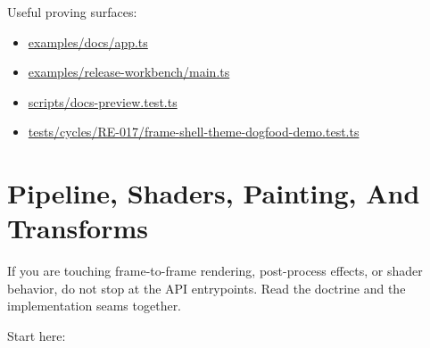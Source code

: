 Useful proving surfaces:

\begin{itemize}
\tightlist
\item
  \href{https://github.com/flyingrobots/bijou/blob/cbd70612140e7a450d764b3c7be1c6af878b99bc/examples/docs/app.ts}{examples/docs/app.ts}
\item
  \href{https://github.com/flyingrobots/bijou/blob/cbd70612140e7a450d764b3c7be1c6af878b99bc/examples/release-workbench/main.ts}{examples/release-workbench/main.ts}
\item
  \href{https://github.com/flyingrobots/bijou/blob/cbd70612140e7a450d764b3c7be1c6af878b99bc/scripts/docs-preview.test.ts}{scripts/docs-preview.test.ts}
\item
  \href{https://github.com/flyingrobots/bijou/blob/cbd70612140e7a450d764b3c7be1c6af878b99bc/tests/cycles/RE-017/frame-shell-theme-dogfood-demo.test.ts}{tests/cycles/RE-017/frame-shell-theme-dogfood-demo.test.ts}
\end{itemize}

\section{Pipeline, Shaders, Painting, And Transforms}\label{record-001-pipeline-shaders-painting-and-transforms}

If you are touching frame-to-frame rendering, post-process effects, or shader behavior, do not stop at the API entrypoints. Read the doctrine and the implementation seams together.

Start here:

